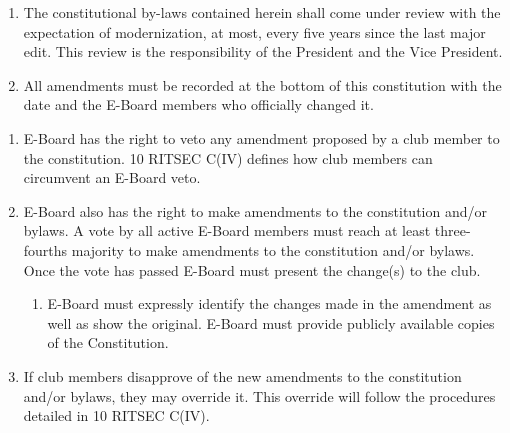 


\begin{enumerate}
      \item The constitutional by-laws contained herein shall come under review with the
            expectation of modernization, at most, every five years since the last major
            edit. This review is the responsibility of the President and the Vice
            President.
      \item All amendments must be recorded at the bottom of this constitution with the
            date and the E-Board members who officially changed it.
\end{enumerate}


\begin{enumerate}
      \item E-Board has the right to veto any amendment proposed by a club member to the
            constitution. 10 RITSEC C(IV) defines how club members can circumvent an
            E-Board veto.
      \item E-Board also has the right to make amendments to the constitution and/or
            bylaws. A vote by all active E-Board members must reach at least three-fourths
            majority to make amendments to the constitution and/or bylaws. Once the vote
            has passed E-Board must present the change(s) to the club.
            \begin{enumerate}
                  \item E-Board must expressly identify the changes made in the amendment as well as
                        show the original. E-Board must provide publicly available copies of the
                        Constitution.
            \end{enumerate}
      \item If club members disapprove of the new amendments to the constitution and/or
            bylaws, they may override it. This override will follow the procedures detailed
            in 10 RITSEC C(IV).
\end{enumerate}


